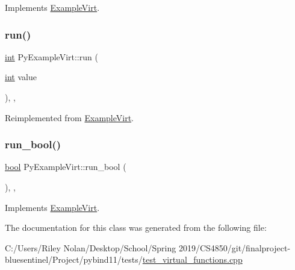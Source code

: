 Implements \mbox{\hyperlink{class_example_virt_a515529fab251071921dc865f2075f920}{Example\+Virt}}.

\mbox{\label{class_py_example_virt_a3052c214b7978396f0c4cbbebe8a8fef}} 
\subsubsection{\texorpdfstring{run()}{run()}}
{\footnotesize\ttfamily \mbox{\hyperlink{warnings_8h_a74f207b5aa4ba51c3a2ad59b219a423b}{int}} Py\+Example\+Virt\+::run (\begin{DoxyParamCaption}\item[{\mbox{\hyperlink{warnings_8h_a74f207b5aa4ba51c3a2ad59b219a423b}{int}}}]{value }\end{DoxyParamCaption})\hspace{0.3cm}{\ttfamily [inline]}, {\ttfamily [override]}, {\ttfamily [virtual]}}



Reimplemented from \mbox{\hyperlink{class_example_virt_a912c8aeca102f6654bfd3746c7b90fd9}{Example\+Virt}}.

\mbox{\label{class_py_example_virt_ab6ad12451054f8d9004204ae5101f57c}} 
\subsubsection{\texorpdfstring{run\_bool()}{run\_bool()}}
{\footnotesize\ttfamily \mbox{\hyperlink{asdl_8h_af6a258d8f3ee5206d682d799316314b1}{bool}} Py\+Example\+Virt\+::run\+\_\+bool (\begin{DoxyParamCaption}{ }\end{DoxyParamCaption})\hspace{0.3cm}{\ttfamily [inline]}, {\ttfamily [override]}, {\ttfamily [virtual]}}



Implements \mbox{\hyperlink{class_example_virt_a9c70a3e16f56f6bafe352415cec884ff}{Example\+Virt}}.



The documentation for this class was generated from the following file\+:\begin{DoxyCompactItemize}
\item 
C\+:/\+Users/\+Riley Nolan/\+Desktop/\+School/\+Spring 2019/\+C\+S4850/git/finalproject-\/bluesentinel/\+Project/pybind11/tests/\mbox{\hyperlink{test__virtual__functions_8cpp}{test\+\_\+virtual\+\_\+functions.\+cpp}}\end{DoxyCompactItemize}
